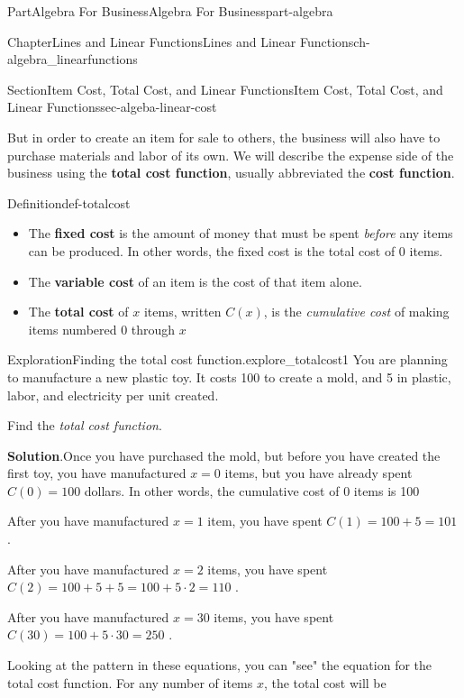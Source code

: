 \documentclass{tufte-book}
\newcommand{\blocktitlefont}{\relax}
\newcommand{\terminology}[1]{\textbf{#1}}
\numberwithin{equation}{chapter}
\begin{document}
\begin{partptx}{Part}{Algebra For Business}{}{Algebra For Business}{}{}{part-algebra}
\begin{chapterptx}{Chapter}{Lines and Linear Functions}{}{Lines and Linear Functions}{}{}{ch-algebra_linearfunctions}
\begin{sectionptx}{Section}{Item Cost, Total Cost, and Linear Functions}{}{Item Cost, Total Cost, and Linear Functions}{}{}{sec-algeba-linear-cost}
\par
But in order to create an item for sale to others, the business will also have to purchase materials and labor of its own.  We will describe the expense side of the business using the \terminology{total cost function}, usually abbreviated the \terminology{cost function}.%
\begin{definition}{Definition}{}{def-totalcost}%
%
\begin{itemize}[label=\textbullet]
\item{}The \terminology{fixed cost} is the amount of money that must be spent \emph{before} any items can be produced.  In other words, the fixed cost is the total cost of 0 items.%
\item{}The \terminology{variable cost} of an item is the cost of that item alone.%
\item{}The \terminology{total cost} of \(x\) items, written \(C(x)\), is the \emph{cumulative cost} of making items numbered \(0\) through \(x\)%
\end{itemize}
%
\end{definition}
\begin{exploration}{Exploration}{Finding the total cost function.}{explore_totalcost1}%
You are planning to manufacture a new plastic toy. It costs \textdollar{}100 to create a mold, and \textdollar{}5 in plastic, labor, and electricity per unit created.%
\par
Find the \emph{total cost function}.%
\par\smallskip%
\noindent\textbf{\blocktitlefont Solution}.\hypertarget{explore_totalcost1-3}{}\quad{}Once you have purchased the mold, but before you have created the first toy, you have manufactured \(x=0\) items, but you have already spent \(C(0)=100\) dollars.  In other words, the cumulative cost of 0 items is 100\textdollar{}%
\par
After you have manufactured \(x=1\) item, you have spent \(C(1) = 100 + 5 = 101 \) \textdollar{}.%
\par
After you have manufactured \(x=2\) items, you have spent \(C(2) = 100 + 5 + 5 =  100 + 5\cdot 2 =  110 \) \textdollar{}.%
\par
After you have manufactured \(x=30\) items, you have spent \(C(30) = 100 + 5\cdot 30 = 250 \) \textdollar{}.%
\par
Looking at the pattern in these equations, you can "see" the equation for the total cost  function.  For any number of items \(x\), the total cost will be%
\begin{equation*}

\end{equation*}
\end{exploration}
\end{sectionptx}
\end{chapterptx}
\end{partptx}
\end{document}
